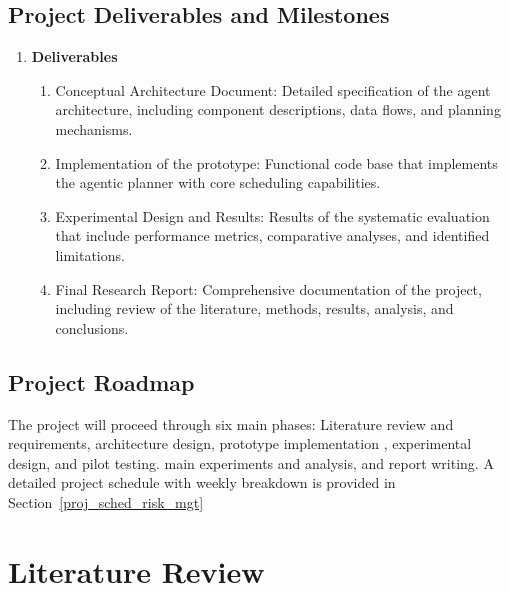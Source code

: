 \documentclass[12pt]{article}
\begin{document}
\subsection{Project Deliverables and Milestones}
    \begin{enumerate}
        \item \textbf{Deliverables}
        \begin{enumerate}
            \item Conceptual Architecture Document: Detailed specification of the agent architecture, including component descriptions, data flows, and planning mechanisms.
            \item Implementation of the prototype: Functional code base that implements the agentic planner with core scheduling capabilities.
            \item Experimental Design and Results: Results of the systematic evaluation that include performance metrics, comparative analyses, and identified limitations.
            \item Final Research Report: Comprehensive documentation of the project, including review of the literature, methods, results, analysis, and conclusions.
        \end{enumerate}
    \end{enumerate}

\subsection{Project Roadmap}
The project will proceed through six main phases: Literature review and requirements, architecture design, prototype implementation , experimental design, and pilot testing. main experiments and analysis, and report writing. A detailed project schedule with weekly breakdown is provided in Section~\ref{proj_sched_risk_mgt}
\section{Literature Review}
\end{document}
